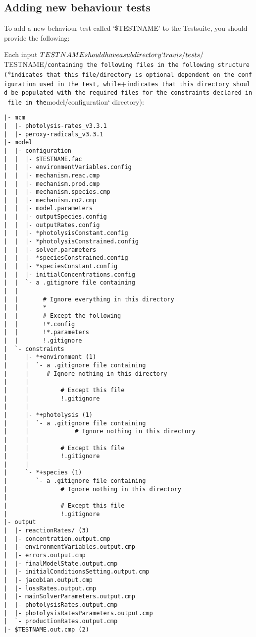 \hypertarget{adding-new-behaviour-tests}{%
\subsection{Adding new behaviour
tests}\label{adding-new-behaviour-tests}}

To add a new behaviour test called `\$TESTNAME' to the Testsuite, you
should provide the following:

Each input
\(TESTNAME should have a subdirectory `travis/tests/\)TESTNAME/\texttt{containing\ the\ following\ files\ in\ the\ following\ structure\ (}*\texttt{indicates\ that\ this\ file/directory\ is\ optional\ dependent\ on\ the\ configuration\ used\ in\ the\ test,\ while}+\texttt{indicates\ that\ this\ directory\ should\ be\ populated\ with\ the\ required\ files\ for\ the\ constraints\ declared\ in\ file\ in\ the}model/configuration`
directory):

\begin{verbatim}
|- mcm
|  |- photolysis-rates_v3.3.1
|  |- peroxy-radicals_v3.3.1
|- model
|  |- configuration
|  |  |- $TESTNAME.fac
|  |  |- environmentVariables.config
|  |  |- mechanism.reac.cmp
|  |  |- mechanism.prod.cmp
|  |  |- mechanism.species.cmp
|  |  |- mechanism.ro2.cmp
|  |  |- model.parameters
|  |  |- outputSpecies.config
|  |  |- outputRates.config
|  |  |- *photolysisConstant.config
|  |  |- *photolysisConstrained.config
|  |  |- solver.parameters
|  |  |- *speciesConstrained.config
|  |  |- *speciesConstant.config
|  |  |- initialConcentrations.config
|  |  `- a .gitignore file containing 
|  |
|  |       # Ignore everything in this directory
|  |       *
|  |       # Except the following
|  |       !*.config
|  |       !*.parameters
|  |       !.gitignore
|  `- constraints
|     |- *+environment (1)
|     |  `- a .gitignore file containing
|     |     # Ignore nothing in this directory
|     |
|     |         # Except this file
|     |         !.gitignore
|     |
|     |- *+photolysis (1)
|     |  `- a .gitignore file containing
|     |             # Ignore nothing in this directory
|     |
|     |         # Except this file
|     |         !.gitignore
|     |
|     `- *+species (1)
|        `- a .gitignore file containing
|               # Ignore nothing in this directory
|
|               # Except this file
|               !.gitignore
|- output
|  |- reactionRates/ (3)
|  |- concentration.output.cmp
|  |- environmentVariables.output.cmp
|  |- errors.output.cmp
|  |- finalModelState.output.cmp
|  |- initialConditionsSetting.output.cmp
|  |- jacobian.output.cmp
|  |- lossRates.output.cmp
|  |- mainSolverParameters.output.cmp
|  |- photolysisRates.output.cmp
|  |- photolysisRatesParameters.output.cmp
|  `- productionRates.output.cmp
|- $TESTNAME.out.cmp (2)
\end{verbatim}

